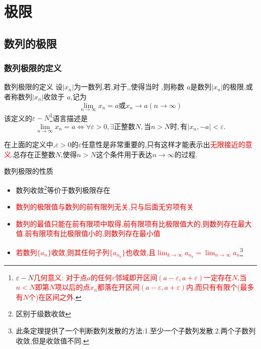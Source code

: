 \documentclass[8pt a4paper, oneside, UTF8]{ctexbook}
\begin{document}
\begin{sloppypar}
    \else
    \fi
    \chapter{极限}
    \section{数列的极限}
    \subsection{数列极限的定义}
    \begin{defn}{数列极限的定义}{}
        设$|x_n|$为一数列,若,对于,,使得当时 ,则称数 $a$是数列$| x_n |$的极限,或者称数列$| x_n |$收敛于 $a$,记为
        $$
            \lim_{n\to\infty}x_n=a\text{或}x_n\to a(n\to\infty)
        $$
        该定义的$\varepsilon-N$\footnote{$\varepsilon - N$\textcolor{red}{几何意义: 对于点$a$的任何$\varepsilon$邻域即开区间$(a-\varepsilon,a+\varepsilon)$一定存在$N$,当$n < N$即第$N$项以后的点$x_n$都落在开区间$(a-\varepsilon,a+\varepsilon)$内,而只有有限个(最多有$N$个)在区间之外.}}语言描述是
        \newline
        $$\lim_{n\to\infty}x_n=a\Leftrightarrow\forall\varepsilon>0,\exists\text{正整数}N,\text{当}n>N\text{时},\text{有}|x_n,-a|<\varepsilon.$$
    \end{defn}
    在上面的定义中,$\varepsilon>0$的$\varepsilon$任意性是非常重要的,只有这样才能表示出\textcolor{red}{无限接近的意义}.总存在正整数$N$,使得$n>N$这个条件用于表达$n \to \infty$的过程.
    \begin{criterion}{数列极限的性质}{}
        \begin{itemize}
            \item 数列收敛\footnote{区别于级数收敛}等价于数列极限存在
            \item \textcolor{red}{数列的极限值与数列的前有限列无关,只与后面无穷项有关}
            \item \textcolor{red}{数列的最值只能在前有限项中取得,前有限项有比极限值大的,则数列存在最大值.前有限项有比极限值小的,则数列存在最小值}
            \item \textcolor{red}{若数列$\{a_n\}$收敛,则其任何子列$\{a_{n_k}\}$也收敛,且$\lim_{k\to\infty}a_{n_k}=\lim_{n\to\infty}a_n$}\footnote{ 此条定理提供了一个判断数列发散的方法:1.至少一个子数列发散.2.两个子数列收敛,但是收敛值不同.}

\end{itemize}
\end{criterion}
\end{sloppypar}
\end{document}
